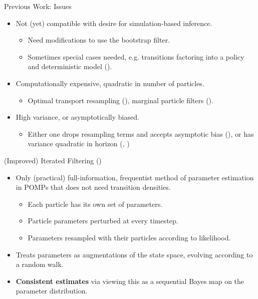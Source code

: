 \documentclass{beamer}
\begin{document}
\begin{frame}{Previous Work: Issues}
    \begin{itemize}
        \item Not (yet) compatible with desire for simulation-based inference.
        \begin{itemize}
            \item \pause Need modifications to use the bootstrap filter.
            \item \pause Sometimes special cases needed, e.g. transitions factoring into a policy and deterministic model (\cite{singh22}).
        \end{itemize}
        \item \pause Computationally expensive, quadratic in number of particles.
        \begin{itemize}
            \item \pause Optimal transport resampling (\cite{corenflos21}), marginal particle filters (\cite{scibior21}).
        \end{itemize}
        \item \pause High variance, or asymptotically biased.
        \begin{itemize}
            \item \pause Either one drops resampling terms and accepts asymptotic bias (\cite{naesseth18}), or has variance quadratic in horizon (\cite{poyiadjis11}, \cite{scibior21})
        \end{itemize}
    \end{itemize}
\end{frame}

\begin{frame}{(Improved) Iterated Filtering (\cite{ionides15})}
    \begin{itemize}
        \item Only (practical) full-information, frequentist method of parameter estimation in POMPs that does not need transition densities. 
        \begin{itemize}
            \item \pause Each particle has its own set of parameters.
            \item \pause Particle parameters perturbed at every timestep.
            \item \pause Parameters resampled with their particles according to likelihood.
        \end{itemize}
        \item \pause Treats parameters as augmentations of the state space, evolving according to a random walk.
        \item \pause \textbf{Consistent estimates} via viewing this as a sequential Bayes map on the parameter distribution.
    \end{itemize}
\end{frame}
\end{document}
